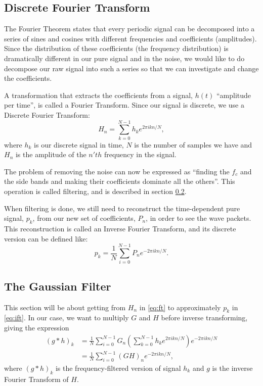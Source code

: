 \documentclass[12pt,a4paper]{article}
\begin{document}
\subsection{Discrete Fourier Transform}
The Fourier Theorem states that every periodic signal can be decomposed into
a series of sines and cosines with different frequencies and coefficients (amplitudes).
Since the distribution of these coefficients (the frequency distribution)
is dramatically different in our pure signal and in the noise,
we would like to do decompose our raw signal into such a series so that we can
investigate and change the coefficients.

A transformation that extracts the coefficients from a signal, $h(t)$ ``amplitude per time'',
is called a Fourier Transform. Since our signal is discrete, we use a Discrete Fourier
Transform:
\begin{equation}\label{eq:ft}
  H_n = \sum_{k=0}^{N-1} h_ke^{2\pi ikn/N},
\end{equation}
where $h_k$ is our discrete signal in time, $N$ is the number of samples we have and
$H_n$ is the amplitude of the $n'th$ frequency in the signal.

The problem of removing the noise can now be expressed as
``finding the $f_c$ and the side bands and making their coefficients
dominate all the others''. This operation is called filtering, and is
described in section \ref{sec:gauss}.

When filtering is done,
we still need to reconstruct the time-dependent pure signal, $p_k$,
from our new set of
coefficients, $P_n$, in order to see the wave packets.
This reconstruction is called
an Inverse Fourier Transform, and its discrete version can be defined like:
\begin{equation}\label{eq:ift}
  p_k = \frac1N\sum_{i=0}^{N-1}P_ne^{-2\pi ikn/N}.
\end{equation}


\subsection{The Gaussian Filter}\label{sec:gauss}
This section will be about getting from $H_n$ in \eqref{eq:ft}
to approximately $p_k$ in \eqref{eq:ift}.
In our case, we want to multiply $G$ and $H$ before inverse transforming,
giving the expression
\begin{align}
  (g*h)_k &= \frac1N\sum_{i=0}^{N-1}G_n(\sum_{k=0}^{N-1} h_ke^{2\pi ikn/N})e^{-2\pi ikn/N}\\
          &= \frac1N\sum_{i=0}^{N-1}(GH)_ne^{-2\pi ikn/N},
\end{align}
where $(g*h)_k$ is the frequency-filtered version of signal $h_k$ and $g$
is the inverse Fourier Transform of $H$.
\end{document}
